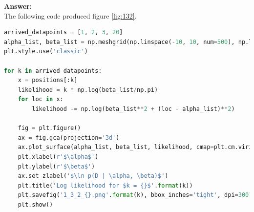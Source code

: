 \documentclass[a4paper]{article}
\begin{document}
\textbf{Answer:}\\

The following code produced figure \ref{fig:132}.

\begin{lstlisting}[language=Python]
arrived_datapoints = [1, 2, 3, 20]
alpha_list, beta_list = np.meshgrid(np.linspace(-10, 10, num=500), np.linspace(0, 5, num=250))
plt.style.use('classic')

for k in arrived_datapoints:
    x = positions[:k]
    likelihood = k * np.log(beta_list/np.pi)
    for loc in x:
        likelihood -= np.log(beta_list**2 + (loc - alpha_list)**2)
        
    fig = plt.figure()
    ax = fig.gca(projection='3d')
    ax.plot_surface(alpha_list, beta_list, likelihood, cmap=plt.cm.viridis, vmin=-200, vmax=likelihood.max())
    plt.xlabel(r'$\alpha$')
    plt.ylabel(r'$\beta$')
    ax.set_zlabel('$\ln p(D | \alpha, \beta)$')
    plt.title('Log likelihood for $k = {}$'.format(k))
    plt.savefig('1_3_2_{}.png'.format(k), bbox_inches='tight', dpi=300)
    plt.show()
\end{lstlisting}
\end{document}
